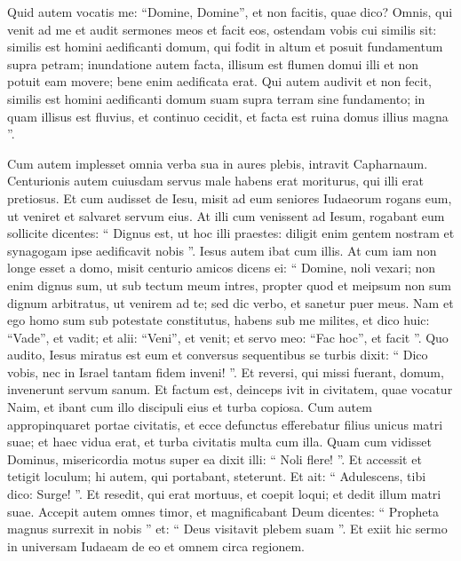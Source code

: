 \begin{biblechapter}
\begin{biblechapter}
\begin{biblechapter}
\begin{biblechapter}
\begin{biblechapter}
\begin{biblechapter}
 \verse Quid autem vocatis me: “Domine, Domine”, et non facitis, quae dico? 
\verse Omnis, qui venit ad me et audit sermones meos et facit eos, ostendam vobis cui similis sit: 
\verse similis est homini aedificanti domum, qui fodit in altum et posuit fundamentum supra petram; inundatione autem facta, illisum est flumen domui illi et non potuit eam movere; bene enim aedificata erat. 
\verse Qui autem audivit et non fecit, similis est homini aedificanti domum suam supra terram sine fundamento; in quam illisus est fluvius, et continuo cecidit, et facta est ruina domus illius magna ”.
 
\begin{biblechapter}
\verse Cum autem implesset omnia verba sua in aures plebis, intravit Capharnaum. 
\verse Centurionis autem cuiusdam servus male habens erat moriturus, qui illi erat pretiosus. 
\verse Et cum audisset de Iesu, misit ad eum seniores Iudaeorum rogans eum, ut veniret et salvaret servum eius. 
\verse At illi cum venissent ad Iesum, rogabant eum sollicite dicentes: “ Dignus est, ut hoc illi praestes: 
\verse diligit enim gentem nostram et synagogam ipse aedificavit nobis ”. 
\verse Iesus autem ibat cum illis. At cum iam non longe esset a domo, misit centurio amicos dicens ei: “ Domine, noli vexari; non enim dignus sum, ut sub tectum meum intres, 
\verse propter quod et meipsum non sum dignum arbitratus, ut venirem ad te; sed dic verbo, et sanetur puer meus. 
\verse Nam et ego homo sum sub potestate constitutus, habens sub me milites, et dico huic: “Vade”, et vadit; et alii: “Veni”, et venit; et servo meo: “Fac hoc”, et facit ”. 
\verse Quo audito, Iesus miratus est eum et conversus sequentibus se turbis dixit: “ Dico vobis, nec in Israel tantam fidem inveni! ”. 
\verse Et reversi, qui missi fuerant, domum, invenerunt servum sanum.
 \verse Et factum est, deinceps ivit in civitatem, quae vocatur Naim, et ibant cum illo discipuli eius et turba copiosa. 
\verse Cum autem appropinquaret portae civitatis, et ecce defunctus efferebatur filius unicus matri suae; et haec vidua erat, et turba civitatis multa cum illa. 
\verse Quam cum vidisset Dominus, misericordia motus super ea dixit illi: “ Noli flere! ”. 
\verse Et accessit et tetigit loculum; hi autem, qui portabant, steterunt. Et ait: “ Adulescens, tibi dico: Surge! ”. 
\verse Et resedit, qui erat mortuus, et coepit loqui; et dedit illum matri suae. 
\verse Accepit autem omnes timor, et magnificabant Deum dicentes: “ Propheta magnus surrexit in nobis ” et: “ Deus visitavit plebem suam ”. 
\verse Et exiit hic sermo in universam Iudaeam de eo et omnem circa regionem.

\end{biblechapter}
\end{biblechapter}
\end{biblechapter}
\end{biblechapter}
\end{biblechapter}
\end{biblechapter}
\end{biblechapter}
